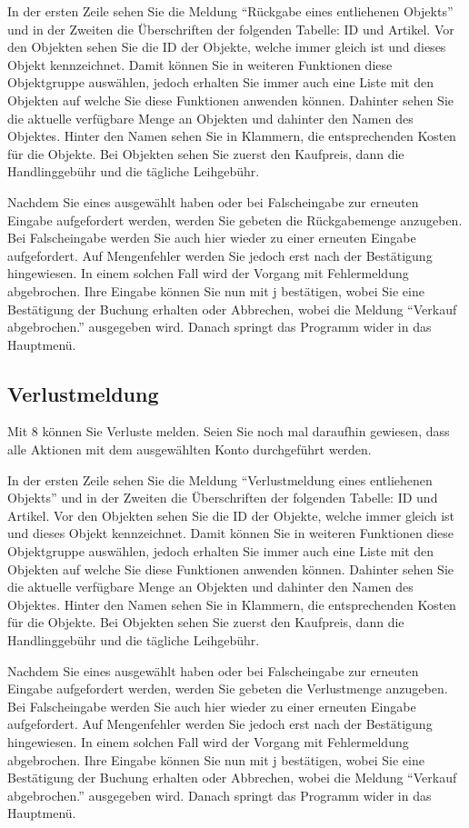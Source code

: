 \documentclass[a4paper,12pt,titlepage]{article}
\begin{document}
In der ersten Zeile sehen Sie die Meldung \enquote{Rückgabe eines entliehenen Objekts}
 und in der Zweiten die Überschriften der folgenden Tabelle: ID und Artikel.
Vor den Objekten sehen Sie die ID der Objekte, welche immer gleich ist und dieses Objekt kennzeichnet.
Damit können Sie in weiteren Funktionen diese Objektgruppe auswählen,
 jedoch erhalten Sie immer auch eine Liste mit den Objekten auf welche Sie diese Funktionen anwenden können.
Dahinter sehen Sie die aktuelle verfügbare Menge an Objekten und dahinter den Namen des Objektes.
Hinter den Namen sehen Sie in Klammern, die entsprechenden Kosten für die Objekte.
Bei Objekten sehen Sie zuerst den Kaufpreis, dann die Handlinggebühr und die tägliche Leihgebühr.

Nachdem Sie eines ausgewählt haben oder bei Falscheingabe zur erneuten Eingabe aufgefordert werden,
 werden Sie gebeten die Rückgabemenge anzugeben.
Bei Falscheingabe werden Sie auch hier wieder zu einer erneuten Eingabe aufgefordert.
Auf Mengenfehler werden Sie jedoch erst nach der Bestätigung hingewiesen.
In einem solchen Fall wird der Vorgang mit Fehlermeldung abgebrochen.
Ihre Eingabe können Sie nun mit j bestätigen,
 wobei Sie eine Bestätigung der Buchung erhalten oder Abbrechen,
 wobei die Meldung \enquote{Verkauf abgebrochen.} ausgegeben wird.
Danach springt das Programm wider in das Hauptmenü.
\subsection{Verlustmeldung}
Mit 8 können Sie Verluste melden.
Seien Sie noch mal daraufhin gewiesen, dass alle Aktionen mit dem ausgewählten Konto durchgeführt werden.

In der ersten Zeile sehen Sie die Meldung \enquote{Verlustmeldung eines entliehenen Objekts}
 und in der Zweiten die Überschriften der folgenden Tabelle: ID und Artikel.
Vor den Objekten sehen Sie die ID der Objekte, welche immer gleich ist und dieses Objekt kennzeichnet.
Damit können Sie in weiteren Funktionen diese Objektgruppe auswählen,
jedoch erhalten Sie immer auch eine Liste mit den Objekten auf welche Sie diese Funktionen anwenden können.
Dahinter sehen Sie die aktuelle verfügbare Menge an Objekten und dahinter den Namen des Objektes.
Hinter den Namen sehen Sie in Klammern, die entsprechenden Kosten für die Objekte.
Bei Objekten sehen Sie zuerst den Kaufpreis, dann die Handlinggebühr und die tägliche Leihgebühr.

Nachdem Sie eines ausgewählt haben oder bei Falscheingabe zur erneuten Eingabe aufgefordert werden,
 werden Sie gebeten die Verlustmenge anzugeben.
Bei Falscheingabe werden Sie auch hier wieder zu einer erneuten Eingabe aufgefordert.
Auf Mengenfehler werden Sie jedoch erst nach der Bestätigung hingewiesen.
In einem solchen Fall wird der Vorgang mit Fehlermeldung abgebrochen.
Ihre Eingabe können Sie nun mit j bestätigen, wobei Sie eine Bestätigung der Buchung erhalten oder Abbrechen,
 wobei die Meldung \enquote{Verkauf abgebrochen.} ausgegeben wird.
Danach springt das Programm wider in das Hauptmenü.
\end{document}
